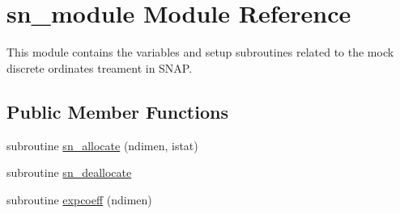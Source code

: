 \hypertarget{classsn__module}{\section{sn\-\_\-module Module Reference}
\label{classsn__module}
}


This module contains the variables and setup subroutines related to the mock discrete ordinates treament in S\-N\-A\-P.  


\subsection*{Public Member Functions}
\begin{DoxyCompactItemize}
\item 
subroutine \hyperlink{classsn__module_a96e40577460722f9d6459532754ffec8}{sn\-\_\-allocate} (ndimen, istat)
\item 
subroutine \hyperlink{classsn__module_a522dde8b096fdc16b8f06026903ee695}{sn\-\_\-deallocate}
\item 
subroutine \hyperlink{classsn__module_ae84f22a96d1692e168f816ee1709ee47}{expcoeff} (ndimen)
\end{DoxyCompactItemize}
